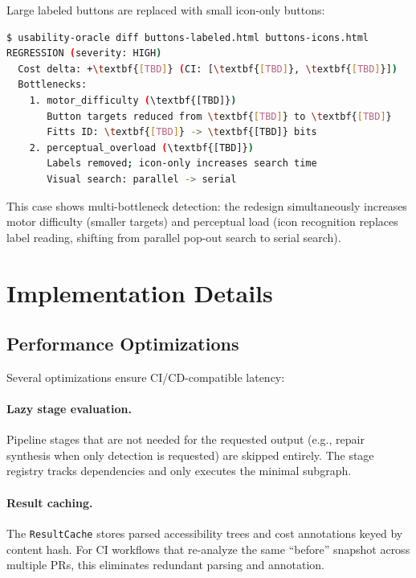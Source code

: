 \documentclass[11pt,twocolumn]{article}
\theoremstyle{definition}
\begin{document}
Large labeled buttons are replaced with small icon-only buttons:

\begin{lstlisting}[language=bash,numbers=none]
$ usability-oracle diff buttons-labeled.html buttons-icons.html
REGRESSION (severity: HIGH)
  Cost delta: +\textbf{[TBD]} (CI: [\textbf{[TBD]}, \textbf{[TBD]}])
  Bottlenecks:
    1. motor_difficulty (\textbf{[TBD]})
       Button targets reduced from \textbf{[TBD]} to \textbf{[TBD]}
       Fitts ID: \textbf{[TBD]} -> \textbf{[TBD]} bits
    2. perceptual_overload (\textbf{[TBD]})
       Labels removed; icon-only increases search time
       Visual search: parallel -> serial
\end{lstlisting}

This case shows multi-bottleneck detection: the redesign simultaneously increases motor difficulty (smaller targets) and perceptual load (icon recognition replaces label reading, shifting from parallel pop-out search to serial search).

\section{Implementation Details}
\label{sec:implementation}

\subsection{Performance Optimizations}

Several optimizations ensure CI/CD-compatible latency:

\paragraph{Lazy stage evaluation.}
Pipeline stages that are not needed for the requested output (e.g., repair synthesis when only detection is requested) are skipped entirely.
The stage registry tracks dependencies and only executes the minimal subgraph.

\paragraph{Result caching.}
The \texttt{ResultCache} stores parsed accessibility trees and cost annotations keyed by content hash.
For CI workflows that re-analyze the same ``before'' snapshot across multiple PRs, this eliminates redundant parsing and annotation.
\end{document}
